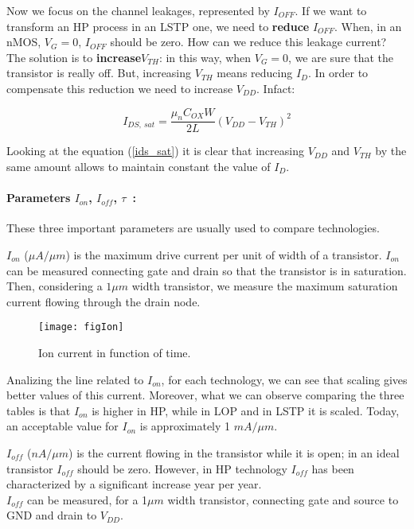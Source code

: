 \documentclass[a4paper, 12pt, twoside, openright]{report}
\begin{document}
Now we focus on the channel leakages, represented by $I_{OFF}$. If we want to transform an HP process in an LSTP one, we need to \textbf{reduce} $I_{OFF}$. When, in an nMOS, $V_G = 0$, $I_{OFF}$ should be zero. How can we reduce this leakage current? The solution is to \textbf{increase}$ V_{TH}$: in this way, when $V_{G} = 0$, we are sure that the transistor is really off. But, increasing $V_{TH}$ means reducing $I_{D}$. In order to compensate this reduction we need to increase $V_{DD}$. Infact:

\begin{equation}
I_{DS,\ sat} = \frac{\mu_n C_{OX} W}{2 L} (V_{DD} - V_{TH})^2
\label{ids_sat}
\end{equation}

Looking at the equation (\ref{ids_sat}) it is clear that increasing $V_{DD}$ and $V_{TH}$ by the same amount allows to maintain constant the value of $I_{D}$.



\paragraph{Parameters $I_{on}$, $I_{off}$, $\tau$~:} These three important parameters are usually used to compare technologies. 

$I_{on}$ ($\mu A/\mu m$) is the maximum drive current per unit of width of a transistor. $I_{on}$ can be measured connecting gate and drain so that the transistor is in saturation. Then, considering a $1 \mu m$ width transistor, we measure the maximum saturation current flowing through the drain node.

	\begin{figure}[h]
	\centering
	\texttt{[image: figIon]}
	\caption{Ion current in function of time.}
	\label{}
	\end{figure}

Analizing the line related to $I_{on}$, for each technology, we can see that scaling gives better values of this current. Moreover, what we can observe comparing the three tables is that $I_{on}$ is higher in HP, while in LOP and in LSTP it is scaled. Today, an acceptable value for $I_{on}$ is approximately 1 $mA/\mu m$.

$I_{off}$ ($nA/\mu m$) is the current flowing in the transistor while it is open; in an ideal transistor $I_{off}$ should be zero. However, in HP technology $I_{off}$ has been characterized by a significant increase year per year.\\
$I_{off}$ can be measured, for a 1$\mu m$ width transistor, connecting gate and source to GND and drain to $V_{DD}$.
\end{document}
